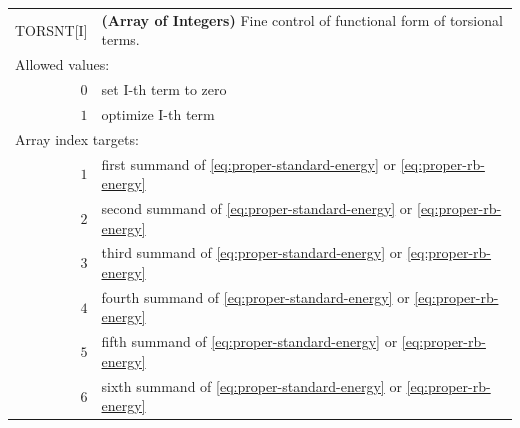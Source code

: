 \documentclass[10pt,a4paper]{report}
\numberwithin{equation}{section}
\begin{document}
{
\begin{tabular}{r@{ : }l}
\label{descr:torsnt}
    TORSNT[I]&\textbf{(Array of Integers)} Fine control of functional form of torsional terms.                                               \\ 
\multicolumn{2}{l}{Allowed values:} \\ 
     \(0\)&set I-th term to zero                                                                                \\ 
     \(1\)&optimize I-th term                                                                                   \\ 
\multicolumn{2}{l}{Array index targets:} \\ 
     \(1\)&first summand of \autoref{eq:proper-standard-energy} or \autoref{eq:proper-rb-energy}                                                                                          \\ 
     \(2\)&second summand of \autoref{eq:proper-standard-energy} or \autoref{eq:proper-rb-energy}                                                                                         \\ 
     \(3\)&third summand of \autoref{eq:proper-standard-energy} or \autoref{eq:proper-rb-energy}                                                                                          \\ 
     \(4\)&fourth summand of \autoref{eq:proper-standard-energy} or \autoref{eq:proper-rb-energy}                                                                                         \\ 
     \(5\)&fifth summand of \autoref{eq:proper-standard-energy} or \autoref{eq:proper-rb-energy}                                                                                          \\ 
     \(6\)&sixth summand of \autoref{eq:proper-standard-energy} or \autoref{eq:proper-rb-energy}                                                                                          \\ 
\end{tabular}
\vspace{1ex}
}
\end{document}

